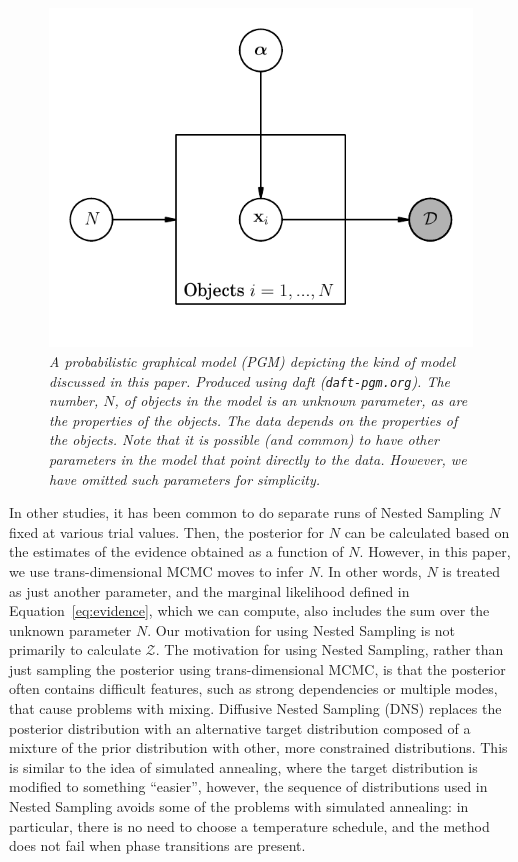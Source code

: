\documentclass[letterpaper, 11pt]{article}
\begin{document}
\begin{figure}
\begin{center}
\includegraphics{pgm.pdf}
\caption{\it A probabilistic graphical model (PGM) depicting the kind
of model discussed in this paper. Produced using daft ({\tt daft-pgm.org}).
The number, $N$, of objects in the model is an unknown parameter, as are the
properties of the objects. The data depends on the properties of the objects.
Note that it is possible (and common) to have other parameters in the model
that point directly to the data. However, we have omitted such parameters
for simplicity.
\label{fig:pgm}}
\end{center}
\end{figure}

In other studies, it has been common to do separate runs of Nested Sampling
$N$ fixed at various trial values. Then, the posterior for $N$ can be calculated
based on the estimates of the evidence obtained as a function of $N$. However,
in this paper, we use trans-dimensional MCMC moves to infer $N$. In other words,
$N$ is treated as just another parameter, and the marginal likelihood defined
in Equation~\ref{eq:evidence}, which we can compute, also includes the sum over
the unknown parameter $N$. Our motivation
for using Nested Sampling is not primarily to calculate $\mathcal{Z}$.
The motivation for using Nested Sampling, rather than just sampling the
posterior using trans-dimensional MCMC, is that the posterior often contains
difficult features, such as strong dependencies or multiple modes, that cause
problems with mixing. Diffusive Nested Sampling
(DNS) replaces the posterior distribution with an alternative target
distribution composed of a mixture of the prior distribution with other, more
constrained distributions. This is similar to the idea of simulated annealing,
where the target distribution is modified to something ``easier'', however,
the sequence of distributions used in Nested Sampling avoids some of the
problems with simulated annealing: in particular, there is no need to choose
a temperature schedule, and the method does not fail when phase transitions
are present.
\end{document}
